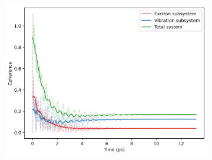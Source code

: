 \documentclass[11pt]{article}
\begin{document}
\begin{figure}[H]
    \vspace{0.5cm}
    
    \begin{subfigure}{0.45\textwidth}
        \centering
        \includegraphics[width=\linewidth]{Research Project/Code/results/ExVib/Open/Coherence/coh_both_eg.png}
        \caption{}
        \label{fig:EVM_OQS_Coh_both_eg}
    \end{subfigure}
    \hfill

    \caption{}
    \label{fig:EVM_OQS_Coh_eg}
\end{figure}
\end{document}

